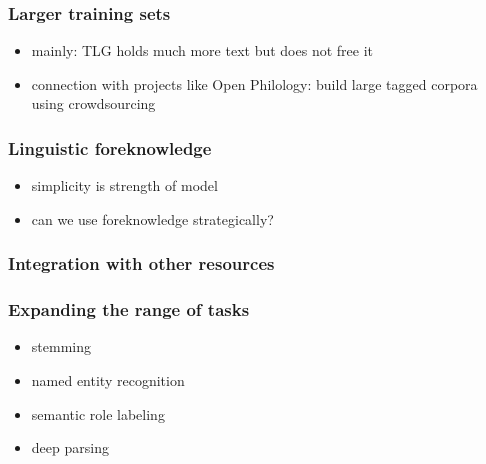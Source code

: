\subsubsection{Larger training sets}
\begin{itemize}
\item mainly: TLG holds much more text but does not free it
\item connection with projects like Open Philology: build large tagged
corpora using crowdsourcing
\end{itemize}
\subsubsection{Linguistic foreknowledge}
\begin{itemize}
\item simplicity is strength of model
\item can we use foreknowledge strategically?
\end{itemize}
\subsubsection{Integration with other resources}
\subsubsection{Expanding the range of tasks}
\begin{itemize}
\item stemming
\item named entity recognition
\item semantic role labeling
\item deep parsing
\end{itemize}


